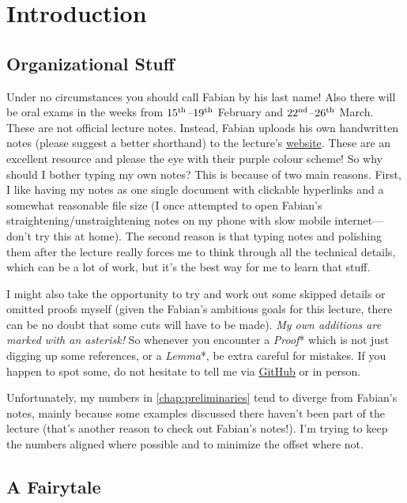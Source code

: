 \chapter{Introduction}
	\section{Organizational Stuff}
	Under no circumstances you should call Fabian by his last name! Also there will be oral exams in the weeks from $15^{\text{th}}$--$19^{\text{th}}$ February and $22^{\text{nd}}$--$26^{\text{th}}$ March.
	These are not official lecture notes. Instead, Fabian uploads his own handwritten notes \cite{KTheory} (please suggest a better shorthand) to the lecture's \href{https://www.math.uni-bonn.de/people/fhebestr/Ktheory/}{website}. These are an excellent resource and please the eye with their purple colour scheme! So why should I bother typing my own notes? This is because of two main reasons. First, I like having my notes as one single document with clickable hyperlinks and a somewhat reasonable file size (I once attempted to open Fabian's straightening/unstraightening notes on my phone with slow mobile internet---don't try this at home).  The second reason is that typing notes and polishing them after the lecture really forces me to think through all the technical details, which can be a lot of work, but it's the best way for me to learn that stuff.
	
	I might also take the opportunity to try and work out some skipped details or omitted proofs myself (given the Fabian's ambitious goals for this lecture, there can be no doubt that some cuts will have to be made). \emph{My own additions are marked with an asterisk!} So whenever you encounter a \emph{Proof}* which is not just digging up some references, or a \emph{Lemma}*, be extra careful for mistakes. If you happen to spot some, do not hesitate to tell me via \href{https://github.com/FlorianAdler/AlgebraBonn/issues/new}{GitHub} or in person.
	
	Unfortunately, my numbers in \cref{chap:preliminaries} tend to diverge from Fabian's notes, mainly because some examples discussed there haven't been part of the lecture (that's another reason to check out Fabian's notes!). I'm trying to keep the numbers aligned where possible and to minimize the offset where not.
	
	
	\section{A Fairytale}


